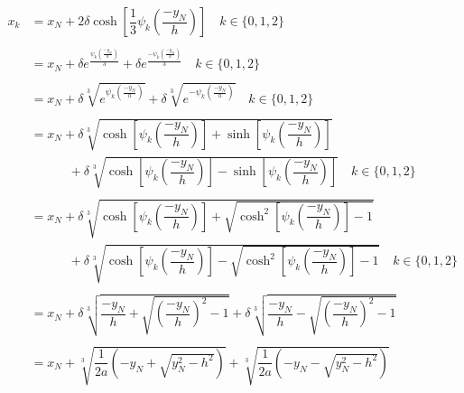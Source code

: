 \documentclass{article}
\begin{document}
\begin{align*}
	x_k &= x_N + 2\delta\cosh\left[\dfrac{1}{3}\psi_k\left(\dfrac{-y_N}{h}\right)\right] \quad k \in \{0, 1, 2\} \\
	\\
	&= x_N + \delta e^{\frac{\psi_k\left(\frac{-y_N}{h}\right)}{3}} + \delta e^{\frac{-\psi_k\left(\frac{-y_N}{h}\right)}{3}} \quad k \in \{0,1,2\}\\
	\\
	&= x_N + \delta\sqrt[3]{e^{\psi_k\left(\frac{-y_N}{h}\right)}} + \delta\sqrt[3]{e^{-\psi_k\left(\frac{-y_N}{h}\right)}} \quad k \in \{0,1,2\}\\
	\\
	&= x_N + \delta\sqrt[3]{\cosh\left[\psi_k\left(\dfrac{-y_N}{h}\right)\right] + \sinh\left[\psi_k\left(\dfrac{-y_N}{h}\right)\right]} \\
	&\quad\quad\quad + \delta\sqrt[3]{\cosh\left[\psi_k\left(\dfrac{-y_N}{h}\right)\right] - \sinh\left[\psi_k\left(\dfrac{-y_N}{h}\right)\right]} \quad k \in \{0,1,2\}\\
	\\
	&= x_N + \delta\sqrt[3]{\cosh\left[\psi_k\left(\dfrac{-y_N}{h}\right)\right] + \sqrt{\cosh^2\left[\psi_k\left(\dfrac{-y_N}{h}\right)\right]-1}} \\
	&\quad \quad \quad + \delta\sqrt[3]{\cosh\left[\psi_k\left(\dfrac{-y_N}{h}\right)\right] - \sqrt{\cosh^2\left[\psi_k\left(\dfrac{-y_N}{h}\right)\right]-1}} \quad k \in \{0,1,2\}\\
	\\
	&= x_N + \delta\sqrt[3]{\dfrac{-y_N}{h} + \sqrt{\left(\dfrac{-y_N}{h}\right)^2-1}} + \delta\sqrt[3]{\dfrac{-y_N}{h} - \sqrt{\left(\dfrac{-y_N}{h}\right)^2-1}} \\
	\\
	&= x_N + \sqrt[3]{\dfrac{1}{2a}\left(-y_N + \sqrt{y_N^2 - h^2}\right)} + \sqrt[3]{\dfrac{1}{2a}\left(-y_N - \sqrt{y_N^2 - h^2}\right)}
\end{align*}

\newpage
\printbibliography
\end{document}
